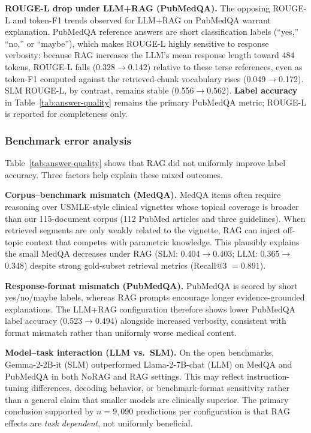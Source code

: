 \textbf{ROUGE-L drop under LLM+RAG (PubMedQA).}
The opposing ROUGE-L and token-F1 trends observed for LLM+RAG on PubMedQA warrant explanation. PubMedQA reference answers are short classification labels (``yes,'' ``no,'' or ``maybe''), which makes ROUGE-L highly sensitive to response verbosity: because RAG increases the LLM's mean response length toward 484 tokens, ROUGE-L falls (0.328$\rightarrow$0.142) relative to these terse references, even as token-F1 computed against the retrieved-chunk vocabulary rises (0.049$\rightarrow$0.172). SLM ROUGE-L, by contrast, remains stable (0.556$\rightarrow$0.562). \textbf{Label accuracy} in Table~\ref{tab:answer-quality} remains the primary PubMedQA metric; ROUGE-L is reported for completeness only.

\subsubsection{Benchmark error analysis}
\label{results:error-analysis}

Table~\ref{tab:answer-quality} shows that RAG did not uniformly improve label accuracy. Three factors help explain these mixed outcomes.

\textbf{Corpus--benchmark mismatch (MedQA).}
MedQA items often require reasoning over USMLE-style clinical vignettes whose topical coverage is broader than our 115-document corpus (112 PubMed articles and three guidelines). When retrieved segments are only weakly related to the vignette, RAG can inject off-topic context that competes with parametric knowledge. This plausibly explains the small MedQA decreases under RAG (SLM: 0.404$\rightarrow$0.403; LLM: 0.365$\rightarrow$0.348) despite strong gold-subset retrieval metrics (Recall@3 $=0.891$).

\textbf{Response-format mismatch (PubMedQA).}
PubMedQA is scored by short yes/no/maybe labels, whereas RAG prompts encourage longer evidence-grounded explanations. The LLM+RAG configuration therefore shows lower PubMedQA label accuracy (0.523$\rightarrow$0.494) alongside increased verbosity, consistent with format mismatch rather than uniformly worse medical content.

\textbf{Model--task interaction (LLM vs.\ SLM).}
On the open benchmarks, Gemma-2-2B-it (SLM) outperformed Llama-2-7B-chat (LLM) on MedQA and PubMedQA in both NoRAG and RAG settings. This may reflect instruction-tuning differences, decoding behavior, or benchmark-format sensitivity rather than a general claim that smaller models are clinically superior. The primary conclusion supported by $n{=}9{,}090$ predictions per configuration is that RAG effects are \emph{task dependent}, not uniformly beneficial.

